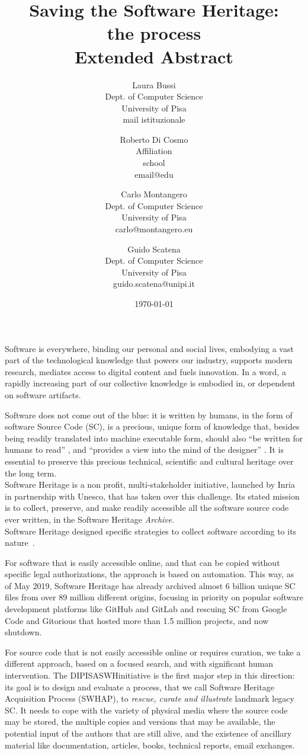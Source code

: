\documentclass[a4paper]{article}
\title{Saving the Software Heritage:
				\\ the process  
				\\ 	\large Extended Abstract
}
\author{
    Laura Bussi\\
    Dept. of Computer Science\\
    University of Pisa\\
    mail istituzionale
	\and
    Roberto Di Cosmo\\
    Affiliation\\
    school\\
    email@edu
  \and
    Carlo Montangero\\
    Dept. of Computer Science\\
    University of Pisa\\
    carlo@montangero.eu
  \and
    Guido Scatena\\
		Dept. of Computer Science\\
    University of Pisa\\
    guido.scatena@unipi.it
}
\date{\today}
\newcommand{\DIPISASWHinitiative}{DIPISASWHinitiative }
\begin{document}
\maketitle


\noindent              
Software is everywhere,  binding our personal and social lives, embodying a vast part of the technological knowledge that powers our industry, supports modern research, mediates access to digital content and fuels innovation. In a word, a rapidly increasing part of our collective knowledge is embodied in, or dependent on software artifacts. 

Software does not come out of the blue: it is written by humans, in the form of software Source Code (SC), is a precious, unique form of knowledge that, besides being readily translated into machine executable form, should also "`be written for humans to read"' \cite{AbelsonS85}, and "`provides a view into the mind of the designer"' \cite{Shustek06}. It is essential to preserve this precious technical, scientific and cultural heritage over the long term.\\

\noindent
Software Heritage is a non profit, multi-stakeholder initiative, launched by Inria in partnership with Unesco, that has taken over this challenge. Its stated mission is to collect, preserve, and make readily accessible all the software source code ever written, in the Software Heritage \emph{Archive}.\\

Software Heritage designed specific strategies to collect software according to its nature~\cite{swhcacm2018}. 

For software that is easily accessible online, and that can be copied without specific legal authorizations, the approach is based on automation. This way, as of May 2019, Software Heritage has already archived almost 6 billion unique SC files from over 89 million different origins, focusing in priority on popular software development platforms like GitHub and GitLab and rescuing SC from Google Code and Gitorious that hosted more than 1.5 million projects, and now shutdown.

For source code that is not easily accessible online or requires curation, we take a different approach, based on a focused search, and with significant human intervention. The \DIPISASWHinitiative is the first major step in this direction: its goal is to design and evaluate a process, that we call Software Heritage Acquisition Process (SWHAP), to \emph{rescue, curate and illustrate} landmark legacy SC. It needs to cope with the variety of physical media where the source code may be stored, the multiple copies and versions that may be available, the potential input of the authors that are still alive, and the existence of ancillary material like documentation, articles, books, technical reports, email exchanges.\\
\end{document}
